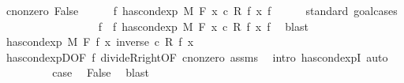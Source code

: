 \begin{isabellebody}
\ c{\isacharunderscore}{\kern0pt}nonzero{\isacharcolon}{\kern0pt}\ False\isanewline
\ \ \ \ \isamarkupfalse%
\ {\isachardoublequoteopen}{\isasymnexists}f{\isacharprime}{\kern0pt}{\isachardot}{\kern0pt}\ has{\isacharunderscore}{\kern0pt}cond{\isacharunderscore}{\kern0pt}exp\ M\ F\ {\isacharparenleft}{\kern0pt}{\isasymlambda}x{\isachardot}{\kern0pt}\ c\ {\isacharasterisk}{\kern0pt}\isactrlsub R\ f\ x{\isacharparenright}{\kern0pt}\ f{\isacharprime}{\kern0pt}{\isachardoublequoteclose}\isanewline
\ \ \ \ \isamarkupfalse%
\ {\isacharparenleft}{\kern0pt}standard{\isacharcomma}{\kern0pt}\ goal{\isacharunderscore}{\kern0pt}cases{\isacharparenright}{\kern0pt}\isanewline
\ \ \ \ \ \ \isamarkupfalse%
\ {}\isanewline
\ \ \ \ \ \ \isamarkupfalse%
\ \isamarkupfalse%
\ f{\isacharprime}{\kern0pt}\ \ f{\isacharprime}{\kern0pt}{\isacharcolon}{\kern0pt}\ {\isachardoublequoteopen}has{\isacharunderscore}{\kern0pt}cond{\isacharunderscore}{\kern0pt}exp\ M\ F\ {\isacharparenleft}{\kern0pt}{\isasymlambda}x{\isachardot}{\kern0pt}\ c\ {\isacharasterisk}{\kern0pt}\isactrlsub R\ f\ x{\isacharparenright}{\kern0pt}\ f{\isacharprime}{\kern0pt}{\isachardoublequoteclose}\ \isamarkupfalse%
\ blast\isanewline
\ \ \ \ \ \ \isamarkupfalse%
\ {\isachardoublequoteopen}has{\isacharunderscore}{\kern0pt}cond{\isacharunderscore}{\kern0pt}exp\ M\ F\ f\ {\isacharparenleft}{\kern0pt}{\isasymlambda}x{\isachardot}{\kern0pt}\ inverse\ c\ {\isacharasterisk}{\kern0pt}\isactrlsub R\ f{\isacharprime}{\kern0pt}\ x{\isacharparenright}{\kern0pt}{\isachardoublequoteclose}\ \isamarkupfalse%
\ has{\isacharunderscore}{\kern0pt}cond{\isacharunderscore}{\kern0pt}expD{\isacharbrackleft}{\kern0pt}OF\ f{\isacharprime}{\kern0pt}{\isacharbrackright}{\kern0pt}\ divideR{\isacharunderscore}{\kern0pt}right{\isacharbrackleft}{\kern0pt}OF\ c{\isacharunderscore}{\kern0pt}nonzero{\isacharbrackright}{\kern0pt}\ assms\ \isamarkupfalse%
\ {\isacharparenleft}{\kern0pt}intro\ has{\isacharunderscore}{\kern0pt}cond{\isacharunderscore}{\kern0pt}expI{\isacharprime}{\kern0pt}{\isacharcomma}{\kern0pt}\ auto{\isacharparenright}{\kern0pt}\isanewline
\ \ \ \ \ \ \isamarkupfalse%
\ \isamarkupfalse%
\ {\isacharquery}{\kern0pt}case\ \isamarkupfalse%
\ False\ \isamarkupfalse%
\ blast\isanewline
\ \ \ \ \isamarkupfalse%
\isanewline
\ \ \ \ \isamarkupfalse%
\ \isamarkupfalse%

\end{isabellebody}
